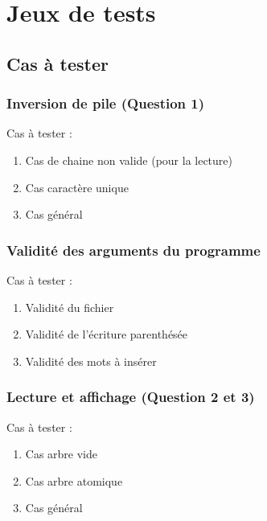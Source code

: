 \documentclass{report}
\newenvironment{myindentpar}[1]%
    {\begin{list}{}%
             {\setlength{\leftmargin}{#1}}%
             \item[]%
     }
     {\end{list}}
\begin{document}
\newpage
\section{Jeux de tests}
\subsection{Cas à tester}
\subsubsection{Inversion de pile (Question 1)}
Cas à tester :
\begin{myindentpar}{2cm}
\begin{enumerate}
    \item Cas de chaine non valide (pour la lecture)
    \item Cas caractère unique
    \item Cas général
\end{enumerate}
\end{myindentpar}

\subsubsection{Validité des arguments du programme}
Cas à tester :
\begin{myindentpar}{2cm}
\begin{enumerate}
    \item Validité du fichier
    \item Validité de l'écriture parenthésée
    \item Validité des mots à insérer
\end{enumerate}
\end{myindentpar}

\subsubsection{Lecture et affichage (Question 2 et 3)}
Cas à tester :
\begin{myindentpar}{2cm}
\begin{enumerate}
    \item Cas arbre vide
    \item Cas arbre atomique
    \item Cas général
\end{enumerate}
\end{myindentpar}
\end{document}
